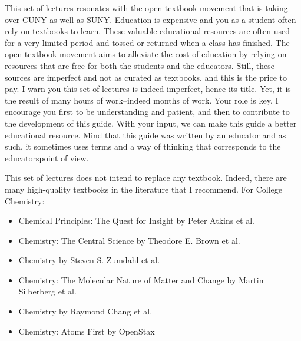 \documentclass[main.tex]{subfiles}
\begin{document}
\begin{fullwidth}
\begin{multicols*}{2}
This set of lectures resonates with the open textbook movement that is taking over CUNY as well as SUNY. Education is expensive and you as a student often rely on textbooks to learn. These valuable educational resources are often used for a very limited period and tossed or returned when a class has finished. The open textbook movement aims to alleviate the cost of education by relying on resources that are free for both the students and the educators. Still, these sources are imperfect and not as curated as textbooks, and this is the price to pay. I warn you this set of lectures is indeed imperfect, hence its title. Yet, it is the result of many hours of work--indeed months of work. Your role is key. I encourage you first to be understanding and patient, and then to contribute to the development of this guide. With your input, we can make this guide a better educational resource. Mind that this guide was written by an educator and as such, it sometimes uses terms and a way of thinking that corresponds to the educators\textquotesingle point of view.

This set of lectures does not intend to replace any textbook. Indeed, there are many high-quality textbooks in the literature that I recommend. For College Chemistry:
\begin{small}\begin{itemize}[label=]
\setlength\itemsep{0.5em}
\item Chemical Principles: The Quest for Insight by Peter Atkins et al.
\item Chemistry: The Central Science by Theodore E. Brown et al.
\item Chemistry by Steven S. Zumdahl et al.
\item Chemistry: The Molecular Nature of Matter and Change by Martin Silberberg et al.
\item Chemistry by Raymond Chang et al.
\item Chemistry: Atoms First by OpenStax
\end{itemize}\end{small}


\end{multicols*}
\end{fullwidth}
\end{document}
